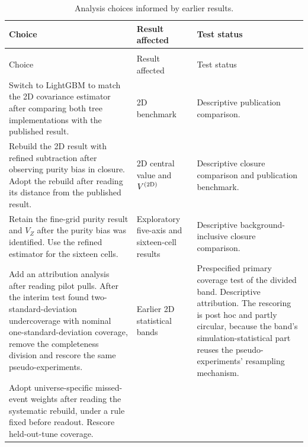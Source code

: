 \begingroup \small
\setlength{\LTcapwidth}{\textwidth}
\setlength{\LTpre}{4pt}
\setlength{\LTpost}{0pt}
\begin{xltabular}{\textwidth}{@{}>{\raggedright\arraybackslash{}\hsize}X
                               >{\raggedright\arraybackslash{}\hsize}X >{\raggedright\arraybackslash{}\hsize}X@{}}
  \caption{Analysis choices informed by earlier results.}
  \label{tab:choices-after-results}
  \label{tab:devhistory}\\
  \toprule Choice & Result affected & Test status \\
  \midrule \endfirsthead {} \\
  \toprule Choice & Result affected & Test status \\
  \midrule \endhead \bottomrule \endlastfoot Switch to LightGBM to match the 2D covariance estimator after comparing both tree implementations with the published result.
  & 2D benchmark & Descriptive publication comparison. \\
  \addlinespace[2pt] Rebuild the 2D result with refined subtraction after observing purity bias in closure. Adopt the rebuild after reading its distance from the published result.
  & 2D central value and $V^{(2\mathrm{D})}$ & Descriptive closure comparison and
  publication benchmark. \\
  \addlinespace[2pt] Retain the fine-grid purity result and $V_Z$ after the purity bias was identified. Use the refined estimator for the sixteen cells.
  & Exploratory five-axis and sixteen-cell results & Descriptive
  background-inclusive closure comparison. \\
  \addlinespace[2pt] Add an attribution analysis after reading pilot pulls. After the interim test found two-standard-deviation undercoverage with nominal one-standard-deviation coverage, remove the completeness division and rescore the same pseudo-experiments.
  & Earlier 2D statistical bands & Prespecified primary coverage test of
  the divided band. Descriptive attribution. The rescoring is post hoc and partly circular, because the band's simulation-statistical part reuses the pseudo-experiments' resampling mechanism. \\
  \addlinespace[2pt] Adopt universe-specific missed-event weights after reading the systematic rebuild, under a rule fixed before readout. Rescore held-out-tune coverage.

\end{xltabular}
